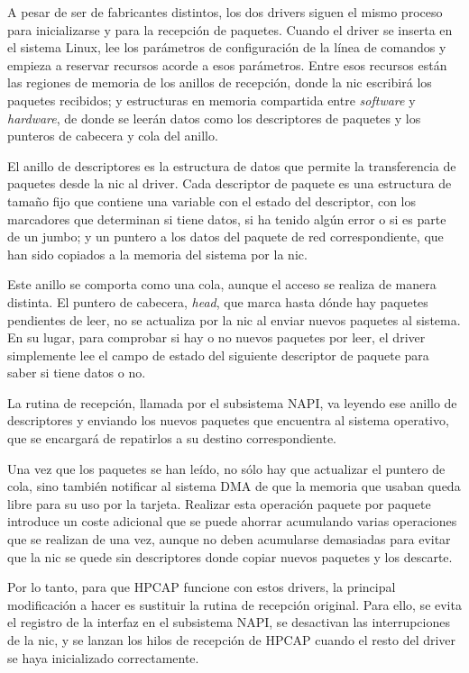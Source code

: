 \documentclass[oneside, draft]{epstfg}
\begin{document}
A pesar de ser de fabricantes distintos, los dos \glspl{driver} siguen el mismo proceso para inicializarse y para la recepción de paquetes. Cuando el \gls{driver} se inserta en el sistema Linux, lee los parámetros de configuración de la línea de comandos y empieza a reservar recursos acorde a esos parámetros. Entre esos recursos están las regiones de memoria de los anillos de recepción, donde la \gls{nic} escribirá los paquetes recibidos; y estructuras en memoria compartida entre \textit{software} y \textit{hardware}, de donde se leerán datos como los descriptores de paquetes y los punteros de cabecera y cola del anillo.

El anillo de descriptores es la estructura de datos que permite la transferencia de paquetes desde la \gls{nic} al \gls{driver}. Cada descriptor de paquete es una estructura de tamaño fijo que contiene una variable con el estado del descriptor, con los marcadores que determinan si tiene datos, si ha tenido algún error o si es parte de un \gls{jumbo}; y un puntero a los datos del paquete de red correspondiente, que han sido copiados a la memoria del sistema por la \gls{nic}.

Este anillo se comporta como una cola, aunque el acceso se realiza de manera distinta. El puntero de cabecera, \textit{head}, que marca hasta dónde hay paquetes pendientes de leer, no se actualiza por la \gls{nic} al enviar nuevos paquetes al sistema. En su lugar, para comprobar si hay o no nuevos paquetes por leer, el \gls{driver} simplemente lee el campo de estado del siguiente descriptor de paquete para saber si tiene datos o no.

La rutina de recepción, llamada por el subsistema \gls{NAPI}, va leyendo ese anillo de descriptores y enviando los nuevos paquetes que encuentra al sistema operativo, que se encargará de repatirlos a su destino correspondiente.

Una vez que los paquetes se han leído, no sólo hay que actualizar el puntero de cola, sino también notificar al sistema \gls{DMA} de que la memoria que usaban queda libre para su uso por la tarjeta. Realizar esta operación paquete por paquete introduce un coste adicional que se puede ahorrar acumulando varias operaciones que se realizan de una vez, aunque no deben acumularse demasiadas para evitar que la \gls{nic} se quede sin descriptores donde copiar nuevos paquetes y los descarte.

Por lo tanto, para que HPCAP funcione con estos \glspl{driver}, la principal modificación a hacer es sustituir la rutina de recepción original. Para ello, se evita el registro de la interfaz en el subsistema \gls{NAPI}, se desactivan las interrupciones de la \gls{nic}, y se lanzan los hilos de recepción de HPCAP cuando el resto del \gls{driver} se haya inicializado correctamente.
\end{document}
